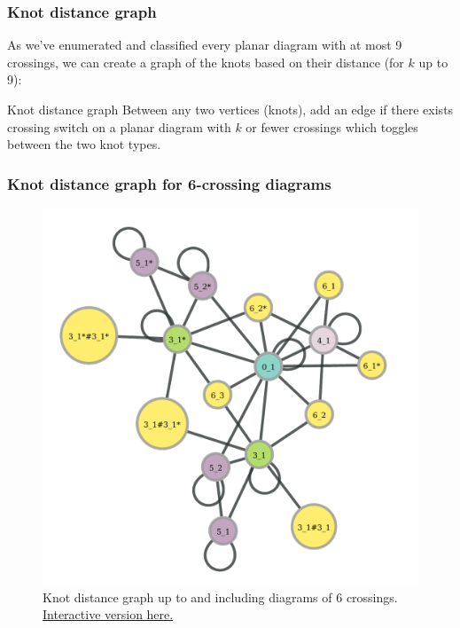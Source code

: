 \documentclass[presentation]{beamer}
\begin{document}
\begin{frame}
  \frametitle{Knot distance graph}
  As we've enumerated and classified every planar diagram with at most
  9 crossings, we can create a graph of the knots based on their
  distance (for $k$ up to 9):

  \begin{block}{Knot distance graph}
    Between any two vertices (knots), add an edge if there exists
    crossing switch on a planar diagram with $k$ or fewer crossings
    which toggles between the two knot types.
  \end{block}

\end{frame}



\begin{frame}
  \frametitle{Knot distance graph for 6-crossing diagrams}
  \begin{figure}
    \centering
    \includegraphics[width=\textwidth,height=.7\textheight,keepaspectratio]{6x_distances.pdf}
    \caption{Knot distance graph up to and including diagrams of 6
      crossings. \href{http://hchapman.github.io/research/6x_graph.html}{Interactive
        version here.}}
    \label{fig:6xgraph}
  \end{figure}
\end{frame}
\end{document}
